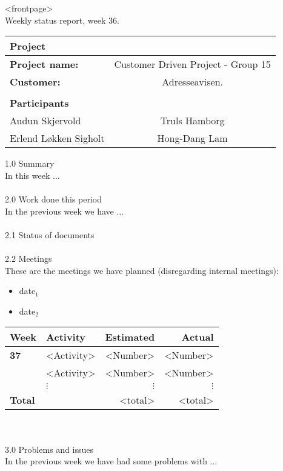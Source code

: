 \begin{center}
<frontpage>\\
Weekly status report, week 36.
  \begin{tabular}{| l  c |}
    \hline
    Project & \\ \hline
    \textbf{Project name:} & Customer Driven Project - Group 15 \\
    \textbf{Customer:} & Adresseavisen. \\ \hline
     & \\
     \textbf{Participants} & \\ \hline
     Audun Skjervold & Truls Hamborg \\
     Erlend Løkken Sigholt & Hong-Dang Lam \\
    \hline
  \end{tabular}
  \end{center}
{\Large{1.0   Summary}} \\
In this week ... \\ \\
{\Large{2.0   Work done this period}} \\
In the previous week we have ... \\ \\
{\large{2.1   Status of documents}} \\ \\
{\large{2.2   Meetings}} \\ 
These are the meetings we have planned (disregarding internal meetings):
\begin{itemize}
\item date$_1$
\item date$_2$
\end{itemize}
  \begin{tabular}{| l | l | r | r |}
    \hline
    \textbf{Week} & \textbf{Activity} & \textbf{Estimated} & \textbf{Actual}\\ \hline
    \textbf{37} & <Activity> & <Number> & <Number> \\ \hline
     & <Activity> & <Number> & <Number> \\ \hline
     & $\vdots$ & $\vdots$ & $\vdots$ \\ \hline
     \textbf{Total }&  & <total> & <total> \\
    \hline
  \end{tabular} \\ \\
{\Large{3.0   Problems and issues}} \\
In the previous week we have had some problems with ... \\ \\
